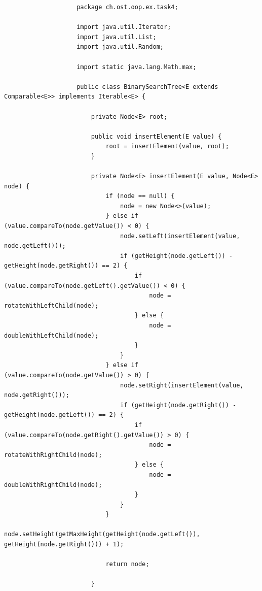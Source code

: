 \documentclass[a4paper, landscape, 8pt]{scrartcl}
\begin{document}
\begin{multicols*}{4}
                \begin{lstlisting}
                    package ch.ost.oop.ex.task4;

                    import java.util.Iterator;
                    import java.util.List;
                    import java.util.Random;

                    import static java.lang.Math.max;

                    public class BinarySearchTree<E extends Comparable<E>> implements Iterable<E> {

                        private Node<E> root;

                        public void insertElement(E value) {
                            root = insertElement(value, root);
                        }

                        private Node<E> insertElement(E value, Node<E> node) {
                            if (node == null) {
                                node = new Node<>(value);
                            } else if (value.compareTo(node.getValue()) < 0) {
                                node.setLeft(insertElement(value, node.getLeft()));
                                if (getHeight(node.getLeft()) - getHeight(node.getRight()) == 2) {
                                    if (value.compareTo(node.getLeft().getValue()) < 0) {
                                        node = rotateWithLeftChild(node);
                                    } else {
                                        node = doubleWithLeftChild(node);
                                    }
                                }
                            } else if (value.compareTo(node.getValue()) > 0) {
                                node.setRight(insertElement(value, node.getRight()));
                                if (getHeight(node.getRight()) - getHeight(node.getLeft()) == 2) {
                                    if (value.compareTo(node.getRight().getValue()) > 0) {
                                        node = rotateWithRightChild(node);
                                    } else {
                                        node = doubleWithRightChild(node);
                                    }
                                }
                            }
                            node.setHeight(getMaxHeight(getHeight(node.getLeft()), getHeight(node.getRight())) + 1);

                            return node;

                        }


\end{lstlisting}
\end{multicols*}
\end{document}
